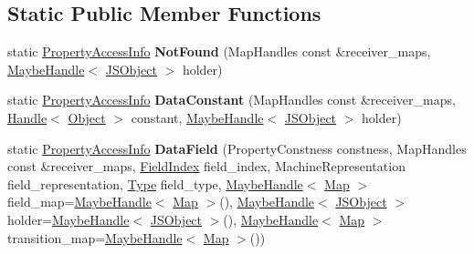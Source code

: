 \subsection*{Static Public Member Functions}
\begin{DoxyCompactItemize}
\item 
\mbox{\label{classv8_1_1internal_1_1compiler_1_1PropertyAccessInfo_a4ab01f3dd9a1ca7afa3a636614727faf}} 
static \mbox{\hyperlink{classv8_1_1internal_1_1compiler_1_1PropertyAccessInfo}{Property\+Access\+Info}} {\bfseries Not\+Found} (Map\+Handles const \&receiver\+\_\+maps, \mbox{\hyperlink{classv8_1_1internal_1_1MaybeHandle}{Maybe\+Handle}}$<$ \mbox{\hyperlink{classv8_1_1internal_1_1JSObject}{J\+S\+Object}} $>$ holder)
\item 
\mbox{\label{classv8_1_1internal_1_1compiler_1_1PropertyAccessInfo_a66245b722b0474b6a0b283354164248f}} 
static \mbox{\hyperlink{classv8_1_1internal_1_1compiler_1_1PropertyAccessInfo}{Property\+Access\+Info}} {\bfseries Data\+Constant} (Map\+Handles const \&receiver\+\_\+maps, \mbox{\hyperlink{classv8_1_1internal_1_1Handle}{Handle}}$<$ \mbox{\hyperlink{classv8_1_1internal_1_1Object}{Object}} $>$ constant, \mbox{\hyperlink{classv8_1_1internal_1_1MaybeHandle}{Maybe\+Handle}}$<$ \mbox{\hyperlink{classv8_1_1internal_1_1JSObject}{J\+S\+Object}} $>$ holder)
\item 
\mbox{\label{classv8_1_1internal_1_1compiler_1_1PropertyAccessInfo_a0abc51531f104fde3ac06b20db363ef5}} 
static \mbox{\hyperlink{classv8_1_1internal_1_1compiler_1_1PropertyAccessInfo}{Property\+Access\+Info}} {\bfseries Data\+Field} (Property\+Constness constness, Map\+Handles const \&receiver\+\_\+maps, \mbox{\hyperlink{classv8_1_1internal_1_1FieldIndex}{Field\+Index}} field\+\_\+index, Machine\+Representation field\+\_\+representation, \mbox{\hyperlink{classv8_1_1internal_1_1compiler_1_1Type}{Type}} field\+\_\+type, \mbox{\hyperlink{classv8_1_1internal_1_1MaybeHandle}{Maybe\+Handle}}$<$ \mbox{\hyperlink{classv8_1_1internal_1_1Map}{Map}} $>$ field\+\_\+map=\mbox{\hyperlink{classv8_1_1internal_1_1MaybeHandle}{Maybe\+Handle}}$<$ \mbox{\hyperlink{classv8_1_1internal_1_1Map}{Map}} $>$(), \mbox{\hyperlink{classv8_1_1internal_1_1MaybeHandle}{Maybe\+Handle}}$<$ \mbox{\hyperlink{classv8_1_1internal_1_1JSObject}{J\+S\+Object}} $>$ holder=\mbox{\hyperlink{classv8_1_1internal_1_1MaybeHandle}{Maybe\+Handle}}$<$ \mbox{\hyperlink{classv8_1_1internal_1_1JSObject}{J\+S\+Object}} $>$(), \mbox{\hyperlink{classv8_1_1internal_1_1MaybeHandle}{Maybe\+Handle}}$<$ \mbox{\hyperlink{classv8_1_1internal_1_1Map}{Map}} $>$ transition\+\_\+map=\mbox{\hyperlink{classv8_1_1internal_1_1MaybeHandle}{Maybe\+Handle}}$<$ \mbox{\hyperlink{classv8_1_1internal_1_1Map}{Map}} $>$())

\end{DoxyCompactItemize}
